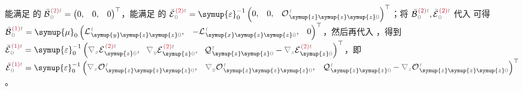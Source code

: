 能满足  的
$\bar{\mathcal{B}}^{\;\!\textcolor{Maroon}{(2)}\mathcolor{gray}{t}}_{\;\!  \mathcolor{gray}{0}} = \begin{pmatrix} 0, & 0, & 0 \end{pmatrix}^\top$，能满足  的 $\bar{\mathcal{E}}^{\;\!\textcolor{Maroon}{(2)}\mathcolor{gray}{t}}_{\;\!  \mathcolor{gray}{0}} = {\symup{\varepsilon}}_0^{-1} \begin{pmatrix} 0, & 0, & {\mathcal{O}}^{\;\!\mathcolor{gray}{t}}_{\;\! \symup{z} \symup{z} \symup{z} \mathcolor{gray}{0}} \end{pmatrix}^\top$；将 $\bar{\mathcal{B}}^{\;\!\textcolor{Maroon}{(2)}\mathcolor{gray}{t}}_{\;\!  \mathcolor{gray}{0}},\bar{\mathcal{E}}^{\;\!\textcolor{Maroon}{(2)}\mathcolor{gray}{t}}_{\;\! \mathcolor{gray}{0}}$ 代入  可得 $\bar{\mathcal{B}}^{\;\!\textcolor{Maroon}{(1)}\mathcolor{gray}{t}}_{\;\!  \mathcolor{gray}{0}} = {\symup{\mu}}_0 \begin{pmatrix} {\mathcal{L}}^{\;\!\mathcolor{gray}{t}}_{\;\! \symup{y} \symup{z} \symup{z} \mathcolor{gray}{0}}, & - {\mathcal{L}}^{\;\!\mathcolor{gray}{t}}_{\;\! \symup{x} \symup{z} \symup{z} \mathcolor{gray}{0}}, & 0 \end{pmatrix}^\top$，然后再代入 ，得到 $\bar{\mathcal{E}}^{\;\!\textcolor{Maroon}{(1)}\mathcolor{gray}{t}}_{\;\!  \mathcolor{gray}{0}} = {\symup{\varepsilon}}_0^{-1} \left( \mathcolor{gray}{\nabla_x} \mathcal{E}^{\;\!\textcolor{Maroon}{(2)}\mathcolor{gray}{t}}_{\;\! \symup{z} \mathcolor{gray}{0}}, \right.$ $\left. \mathcolor{gray}{\nabla_y} \mathcal{E}^{\;\!\textcolor{Maroon}{(2)}\mathcolor{gray}{t}}_{\;\! \symup{z} \mathcolor{gray}{0}},~~ {\mathcal{Q}}^{\;\!\mathcolor{gray}{t}}_{\;\! \symup{z} \symup{z} \mathcolor{gray}{0}} - \mathcolor{gray}{\nabla_z} \mathcal{E}^{\;\!\textcolor{Maroon}{(2)}\mathcolor{gray}{t}}_{\;\! \symup{z} \mathcolor{gray}{0}} \right)^\top$，即 $\bar{\mathcal{E}}^{\;\!\textcolor{Maroon}{(1)}\mathcolor{gray}{t}}_{\;\!  \mathcolor{gray}{0}} = {\symup{\varepsilon}}_0^{-1} \begin{pmatrix} \mathcolor{gray}{\nabla_x} {\mathcal{O}}^{\;\!\mathcolor{gray}{t}}_{\;\! \symup{z} \symup{z} \symup{z} \mathcolor{gray}{0}}, & \mathcolor{gray}{\nabla_y} {\mathcal{O}}^{\;\!\mathcolor{gray}{t}}_{\;\! \symup{z} \symup{z} \symup{z} \mathcolor{gray}{0}}, & {\mathcal{Q}}^{\;\!\mathcolor{gray}{t}}_{\;\! \symup{z} \symup{z} \mathcolor{gray}{0}} - \mathcolor{gray}{\nabla_z} {\mathcal{O}}^{\;\!\mathcolor{gray}{t}}_{\;\! \symup{z} \symup{z} \symup{z} \mathcolor{gray}{0}} \end{pmatrix}^\top$。

